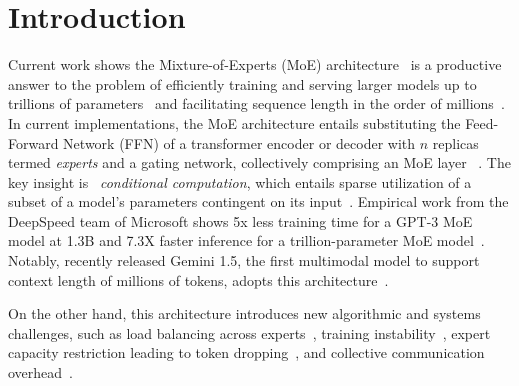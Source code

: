 
\section{Introduction}\label{sec:introduction}
Current work shows the Mixture-of-Experts (MoE) architecture~\cite{10.1162/neco.1991.3.1.79}
is a productive answer to the problem of efficiently training and serving larger models
up to trillions of parameters~\cite{DBLP:journals/corr/abs-2101-03961} and facilitating sequence length in the order of
millions~\cite{Gemini_Team_2024}.
In current implementations, the MoE architecture entails substituting the Feed-Forward Network (FFN) of a transformer
encoder or decoder with $n$ replicas termed \emph{experts} and a gating network, collectively comprising an MoE layer
~\cite{ShazeerMMDLHD17}.
The key insight is ~\emph{conditional computation}, which entails sparse utilization
of a subset of a model’s parameters contingent on its input~\cite{doi:10.1142/S0218001403002411}.
Empirical work from the DeepSpeed team of Microsoft shows 5x less training time for a GPT-3 MoE model at 1.3B and
7.3X faster inference for a trillion-parameter MoE model~\cite{pmlr-v162-rajbhandari22a}.
Notably, recently released Gemini 1.5, the first multimodal model to support context length of millions of tokens,
adopts this architecture~\cite{Gemini_Team_2024}.

On the other hand, this architecture introduces new algorithmic and systems challenges,
such as load balancing across experts~\cite{ShazeerMMDLHD17}, training instability~\cite{NEURIPS2022_3e67e84a},
expert capacity restriction leading to token dropping~\cite{gale2022megablocks},
and collective communication overhead~\cite{DBLP:journals/corr/abs-2006-16668}.